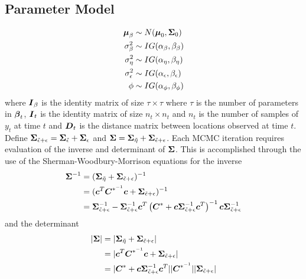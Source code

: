\documentclass[fleqn]{article}
\def\bm#1{\mbox{\boldmath $#1$}}
\begin{document}
\subsection{Parameter Model}
%
\begin{align*}
%
\bm{\mu}_\beta & \sim N(\bm{\mu}_0, \bm{\Sigma}_0)\\
%
\sigma^2_\beta & \sim IG(\alpha_\beta, \beta_\beta)\\
%
\sigma^2_\eta & \sim IG(\alpha_\eta, \beta_\eta)\\
%
\sigma^2_\epsilon & \sim IG(\alpha_\epsilon, \beta_\epsilon)\\
%
\phi & \sim IG(\alpha_\phi, \beta_\phi)
\end{align*}
%
where $\bm{I}_\beta$ is the identity matrix of size $\tau \times \tau$ where $\tau$ is the number of parameters in $\bm{\beta}_t$, $\bm{I}_t$ is the identity matrix of size $n_t \times n_t$ and $n_t$ is the number of samples of $y_t$ at time $t$ and $\bm{D}_t$ is the distance matrix between locations observed at time $t$. Define $\bm{\Sigma}_{\tilde{\epsilon} + \epsilon} = \bm{\Sigma}_{\tilde{\epsilon}} + \bm{\Sigma}_{\epsilon}$ and $\bm{\Sigma} = \bm{\Sigma}_{\tilde{\eta}} + \bm{\Sigma}_{\tilde{\epsilon} + \epsilon}$. Each MCMC iteration requires evaluation of the inverse and determinant of $\bm{\Sigma}$. This is accomplished through the use of the Sherman-Woodbury-Morrison equations for the inverse
\begin{align*}
\bm{\Sigma}^{ - 1} & = (\bm{\Sigma}_{\tilde{\eta}} + \bm{\Sigma}_{\tilde{\epsilon} + \epsilon})^{ - 1}\\
%
 & = (\bm{c}^T \bm{C}^{*^{ - 1}} \bm{c} + \bm{\Sigma}_{\tilde{\epsilon} + \epsilon})^{ - 1}\\
 & = \bm{\Sigma}_{\tilde{\epsilon} + \epsilon}^{ - 1} - \bm{\Sigma}_{\tilde{\epsilon} + \epsilon}^{ - 1} \bm{c}^T \left(\bm{C}^* + \bm{c} \bm{\Sigma}_{\tilde{\epsilon} + \epsilon}^{ - 1} \bm{c}^T \right)^{ - 1} \bm{c} \bm{\Sigma}_{\tilde{\epsilon} + \epsilon}^{ - 1}\\
\end{align*}
and the determinant
\begin{align*}
|\bm{\Sigma}| & = |\bm{\Sigma}_{\tilde{\eta}} + \bm{\Sigma}_{\tilde{\epsilon} + \epsilon}|\\
%
 & = |\bm{c}^T \bm{C}^{*^{ - 1}} \bm{c} + \bm{\Sigma}_{\tilde{\epsilon} + \epsilon}|\\
 & = |\bm{C}^{*} + \bm{c} \bm{\Sigma}_{\tilde{\epsilon} + \epsilon}^{ - 1} \bm{c}^T| |\bm{C}^{*^{ - 1}}| |\bm{\Sigma}_{\tilde{\epsilon} + \epsilon}|
 \end{align*}
\end{document}
